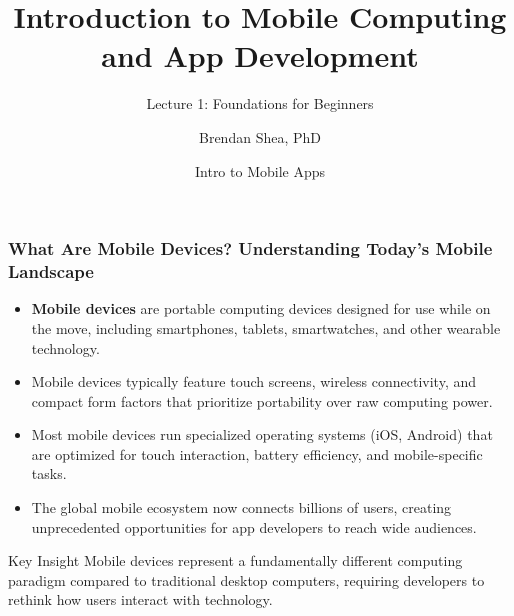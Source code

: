 \documentclass{beamer}
\title{Introduction to Mobile Computing and App Development}
\subtitle{Lecture 1: Foundations for Beginners}
\author{Brendan Shea, PhD}
\date{Intro to Mobile Apps}
\begin{document}
	
	\begin{frame}
		\titlepage
	\end{frame}
	
	\begin{frame}
		\frametitle{What Are Mobile Devices? Understanding Today's Mobile Landscape}
		
		\begin{itemize}
			\item \textbf{Mobile devices} are portable computing devices designed for use while on the move, including smartphones, tablets, smartwatches, and other wearable technology.
			\item Mobile devices typically feature touch screens, wireless connectivity, and compact form factors that prioritize portability over raw computing power.
			\item Most mobile devices run specialized operating systems (iOS, Android) that are optimized for touch interaction, battery efficiency, and mobile-specific tasks.
			\item The global mobile ecosystem now connects billions of users, creating unprecedented opportunities for app developers to reach wide audiences.
		\end{itemize}
		
		\begin{alertblock}{Key Insight}
			\scriptsize
			Mobile devices represent a fundamentally different computing paradigm compared to traditional desktop computers, requiring developers to rethink how users interact with technology.
		\end{alertblock}
		
	\end{frame}
	
\end{document}
